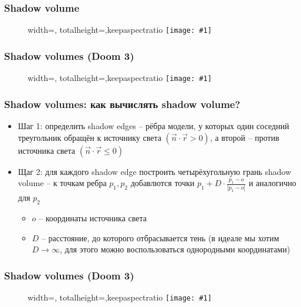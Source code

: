 \documentclass[10pt]{beamer}
\newcommand{\slideimage}[1]{
  \begin{figure}
    \begin{adjustbox}{width=\textwidth, totalheight=\textheight-2\baselineskip-2\baselineskip,keepaspectratio}
      \texttt{[image: \#1]}
    \end{adjustbox}
  \end{figure}
}
\begin{document}
\begin{frame}[fragile]
\frametitle{Shadow volume}
\slideimage{shadow-volume3.png}
\end{frame}

\begin{frame}[fragile]
\frametitle{Shadow volumes (Doom 3)}
\slideimage{doom3-shadows.png}
\end{frame}

\begin{frame}[fragile]
\frametitle{Shadow volumes: как вычислять shadow volume?}
\begin{itemize}
\item Шаг 1: определить shadow edges -- рёбра модели, у которых один соседний треугольник обращён к источнику света \begin{math}\left(\vec n \cdot \vec r > 0\right)\end{math}, а второй -- против источника света \begin{math}\left(\vec n \cdot \vec r \leq 0\right)\end{math}
\pause
\item Щаг 2: для каждого shadow edge построить четырёхугольную грань shadow volume -- к точкам ребра \begin{math}p_1, p_2\end{math} добавлются точки \begin{math}p_1 + D \cdot \frac{p_1 - o}{|p_1 - o|}\end{math} и аналогично для \begin{math}p_2\end{math}
\begin{itemize}
\item \begin{math}o\end{math} -- координаты источника света
\item \begin{math}D\end{math} -- расстояние, до которого отбрасывается тень (в идеале мы хотим \begin{math}D\rightarrow\infty\end{math}, для этого можно воспользоваться однородными координатами)
\end{itemize}
\end{itemize}
\end{frame}

\begin{frame}[fragile]
\frametitle{Shadow volumes (Doom 3)}
\slideimage{shadow-edge.jpg}
\end{frame}
\end{document}
